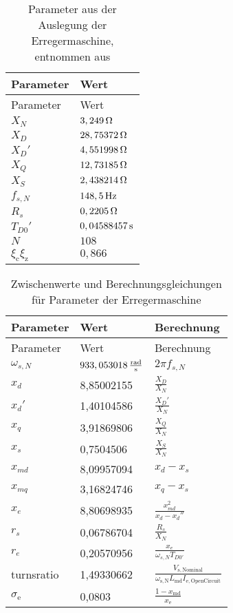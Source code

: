 \begin{longtable}[]{@{}ll@{}}
\caption{Parameter aus der Auslegung der Erregermaschine, entnommen aus \cite{pillerpowersystemsTechnischeDatenErregermaschine,pillerpowersystemsWickelblattErregermaschine272013}}\label{tab:AuslegungErregermaschine}
\tabularnewline
\toprule
Parameter & Wert\tabularnewline
\midrule
\endfirsthead
\toprule
Parameter & Wert\tabularnewline
\midrule
\endhead
\(X_N\)                            & \(\unit[3,249]{\Omega}\)    \\
\(X_D\)                            & \(\unit[28,75372]{\Omega}\) \\
\(X_D'\)                           & \(\unit[4,551998]{\Omega}\) \\
\(X_Q\)                            & \(\unit[12,73185]{\Omega}\) \\
\(X_S\)                            & \(\unit[2,438214]{\Omega}\) \\
\(f_{s,N}\)                        & \(\unit[148,5]{Hz}\)        \\
\(R_s\)                            & \(\unit[0,2205]{\Omega}\)   \\
\(T_{D0}'\)                        & \(\unit[0,04588457]{s}\)    \\
$N$                                & $108$ \\
$\xi_{\mathrm{c}}\xi_{\mathrm{z}}$ & $0,866$ \\
\bottomrule
\end{longtable}

\begin{longtable}[]{@{}lll@{}}
\caption{Zwischenwerte und Berechnungsgleichungen für Parameter der Erregermaschine}\label{tab:ZwischenwerteErregermaschine}
\tabularnewline
\toprule
Parameter & Wert & Berechnung \tabularnewline
\midrule
\endfirsthead
\toprule
Parameter & Wert & Berechnung \tabularnewline\midrule
\endhead
\(\omega_{s,N}\) & \(\unit[933,053018]{\frac{rad}{s}}\) & \(2\pi f_{s,N}\) \tabularnewline
\(x_d\) & 8,85002155 & \(\frac{X_D}{X_N}\) \tabularnewline
\(x_d'\) & 1,40104586 & \(\frac{X_D'}{X_N}\) \tabularnewline
\(x_q\) & 3,91869806 & \(\frac{X_Q}{X_N}\) \tabularnewline
\(x_s\) & 0,7504506 & \(\frac{X_S}{X_N}\) \tabularnewline
\(x_{md}\) & 8,09957094 & \(x_d-x_s\) \tabularnewline
\(x_{mq}\) & 3,16824746 & \(x_q-x_s\)\tabularnewline
\(x_e\) & 8,80698935 & \(\frac{x_{md}^2}{x_d-x_d''}\) \tabularnewline
\(r_s\) & 0,06786704 & \(\frac{R_s}{X_N}\) \tabularnewline
\(r_e\) & 0,20570956 & \(\frac{x_e}{\omega_{s,N}T_{D0'}}\) \tabularnewline
turnsratio & 1,49330662 & \(\frac{V_{\mathrm{s,Nominal}}}{\omega_{\mathrm{s,N}}L_{\mathrm{md}}I_{\mathrm{e,OpenCircuit}}}\)\tabularnewline
$\sigma_\mathrm{e}$& 0,0803 & $\frac{1-x_{\mathrm{md}}}{x_\mathrm e}$ \\
\bottomrule
\end{longtable}

